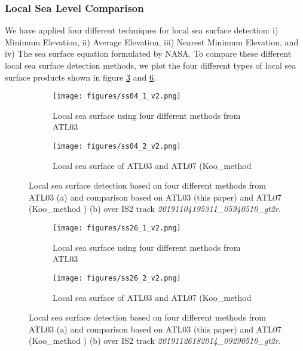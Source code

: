 \subsubsection{Local Sea Level Comparison}
We have applied four different techniques for local sea surface detection: i) Minimum Elevation, ii) Average Elevation, iii) Nearest Minimum Elevation, and iv) The sea surface equation formulated by NASA.
%
To compare these different local sea surface detection methods, we plot the four different types of local sea surface products shown in figure \ref{fig:localSS_1} and \ref{fig:localSS_2}.
%
\begin{figure}[ht]
        \centering

        \begin{subfigure}[b]{\linewidth}
            \centering
            \texttt{[image: figures/ss04\_1\_v2.png]}
            \caption{Local sea surface using four different methods from ATL03}
            \label{fig:ss04_1}
        \end{subfigure}

        \begin{subfigure}[b]{\linewidth}
            \centering
            \texttt{[image: figures/ss04\_2\_v2.png]}
            \caption{Local sea surface of ATL03 and ATL07 (Koo\_method \cite{koo2023sea}}
            \label{fig:ss04_2}
        \end{subfigure}
    \caption{Local sea surface detection based on four different methods from ATL03 (a) and comparison based on ATL03 (this paper) and ATL07 (Koo\_method \cite{koo2023sea}) (b) over IS2 track \textit{20191104195311\_05940510\_gt2r}.} 
    \label{fig:localSS_1}
\end{figure}
%
\begin{figure}[ht]
        \centering
        \begin{subfigure}[b]{\linewidth}
            \centering
            \texttt{[image: figures/ss26\_1\_v2.png]}
            \caption{Local sea surface using four different methods from ATL03}
            \label{fig:ss26_1}
        \end{subfigure}

        \begin{subfigure}[b]{\linewidth}
            \centering
            \texttt{[image: figures/ss26\_2\_v2.png]}
            \caption{Local sea surface of ATL03 and ATL07 (Koo\_method \cite{koo2023sea}}
            \label{fig:ss26_2}
        \end{subfigure}
    \caption{Local sea surface detection based on four different methods from ATL03 (a) and comparison based on ATL03 (this paper) and ATL07 (Koo\_method \cite{koo2023sea}) (b) over IS2 track \textit{20191126182014\_09290510\_gt2r}.} 
    \label{fig:localSS_2}
\end{figure}
